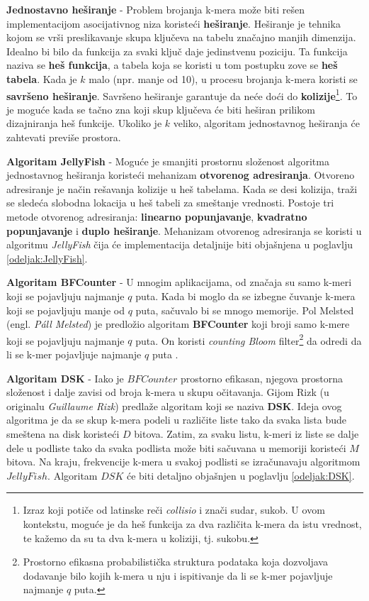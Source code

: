 \documentclass[12pt,oneside]{memoir}
\begin{document}
\textbf{Jednostavno heširanje} - Problem brojanja k-mera može biti rešen implementacijom asocijativnog niza koristeći \textbf{heširanje}. Heširanje je tehnika kojom se vrši preslikavanje skupa ključeva na tabelu značajno manjih dimenzija. Idealno bi bilo da funkcija za svaki ključ
daje jedinstvenu poziciju. Ta funkcija naziva se \textbf{heš funkcija}, a tabela koja se koristi u tom
postupku zove se \textbf{heš tabela}. Kada je $k$ malo (npr. manje od 10), u procesu brojanja k-mera koristi se \textbf{savršeno heširanje}. Savršeno heširanje garantuje da neće doći do \textbf{kolizije}\footnote{Izraz koji potiče od latinske reči \textit{collisio} i znači sudar, sukob. U ovom kontekstu, moguće je da heš funkcija za dva različita k-mera da istu vrednost, te kažemo da su ta dva k-mera u koliziji, tj. sukobu.}. To je moguće kada se tačno zna koji skup ključeva će biti heširan prilikom dizajniranja heš funkcije. Ukoliko je $k$ veliko, algoritam jednostavnog heširanja će zahtevati previše prostora.

\textbf{Algoritam JellyFish} - Moguće je smanjiti prostornu složenost algoritma jednostavnog heširanja koristeći mehanizam \textbf{otvorenog adresiranja}. Otvoreno adresiranje je način rešavanja kolizije u heš tabelama. Kada se desi kolizija, traži se sledeća slobodna lokacija u heš tabeli za smeštanje vrednosti. Postoje tri metode otvorenog adresiranja: \textbf{linearno popunjavanje}, \textbf{kvadratno popunjavanje} i \textbf{duplo heširanje}. Mehanizam otvorenog adresiranja se koristi u algoritmu \textit{JellyFish} čija će implementacija detaljnije biti objašnjena u poglavlju \ref{odeljak:JellyFish}.

\textbf{Algoritam BFCounter} - U mnogim aplikacijama, od značaja su samo k-meri koji se pojavljuju najmanje $q$ puta. Kada bi moglo da se izbegne čuvanje k-mera koji se pojavljuju manje od $q$ puta, sačuvalo bi se mnogo memorije. Pol Melsted (engl. \textit{Páll Melsted}) je predložio algoritam  \textbf{BFCounter} koji broji samo k-mere koji se pojavljuju najmanje $q$ puta. On koristi \textit{counting Bloom} filter\footnote{Prostorno efikasna probabilistička struktura podataka koja dozvoljava dodavanje bilo kojih k-mera u nju i ispitivanje da li se k-mer pojavljuje najmanje $q$ puta.} da odredi da li se k-mer pojavljuje najmanje $q$ puta \cite{WingKinSung}.

\textbf{Algoritam DSK} - Iako je $BFCounter$ prostorno efikasan, njegova prostorna složenost i dalje zavisi od broja  k-mera u skupu očitavanja. Gijom Rizk (u originalu \textit{Guillaume Rizk}) predlaže algoritam koji se naziva \textbf{DSK}. Ideja ovog algoritma je da se skup k-mera podeli u različite liste tako da svaka lista bude smeštena na disk koristeći $D$ bitova. Zatim, za svaku listu, k-meri iz liste se dalje dele u podliste tako da svaka podlista može biti sačuvana u memoriji koristeći $M$ bitova. Na kraju, frekvencije k-mera u svakoj podlisti se izračunavaju algoritmom $JellyFish$. Algoritam $DSK$ će biti detaljno objašnjen u poglavlju \ref{odeljak:DSK}.
\end{document}

